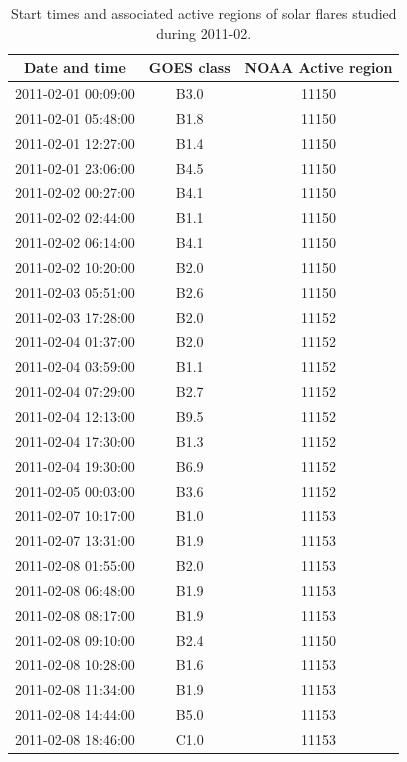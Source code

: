 \documentclass[referee,a4paper,12pt]{swsc}
\begin{document}
\begin{linenumbers}
\begin{longtable}{c|c|c}
	\caption{Start times and associated active regions of solar flares studied during 2011-02.}\\ %
		Date and time & GOES class & NOAA Active region \\
		\hline
		2011-02-01 00:09:00 & B3.0 & 11150 \\ 
		2011-02-01 05:48:00 & B1.8 & 11150 \\ 
		2011-02-01 12:27:00 & B1.4 & 11150 \\ 
		2011-02-01 23:06:00 & B4.5 & 11150 \\ 
		2011-02-02 00:27:00 & B4.1 & 11150 \\ 
		2011-02-02 02:44:00 & B1.1 & 11150 \\ 
		2011-02-02 06:14:00 & B4.1 & 11150 \\ 
		2011-02-02 10:20:00 & B2.0 & 11150 \\ 
		2011-02-03 05:51:00 & B2.6 & 11150 \\ 
		2011-02-03 17:28:00 & B2.0 & 11152 \\ 
		2011-02-04 01:37:00 & B2.0 & 11152 \\ 
		2011-02-04 03:59:00 & B1.1 & 11152 \\ 
		2011-02-04 07:29:00 & B2.7 & 11152 \\ 
		2011-02-04 12:13:00 & B9.5 & 11152 \\ 
		2011-02-04 17:30:00 & B1.3 & 11152 \\ 
		2011-02-04 19:30:00 & B6.9 & 11152 \\ 
		2011-02-05 00:03:00 & B3.6 & 11152 \\ 
		2011-02-07 10:17:00 & B1.0 & 11153 \\ 
		2011-02-07 13:31:00 & B1.9 & 11153 \\ 
		2011-02-08 01:55:00 & B2.0 & 11153 \\ 
		2011-02-08 06:48:00 & B1.9 & 11153 \\ 
		2011-02-08 08:17:00 & B1.9 & 11153 \\ 
		2011-02-08 09:10:00 & B2.4 & 11150 \\ 
		2011-02-08 10:28:00 & B1.6 & 11153 \\ 
		2011-02-08 11:34:00 & B1.9 & 11153 \\ 
		2011-02-08 14:44:00 & B5.0 & 11153 \\ 
		2011-02-08 18:46:00 & C1.0 & 11153 \\ 

\end{longtable}
\end{linenumbers}
\end{document}
